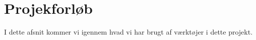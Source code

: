 \section{Projekforløb}
I dette afsnit kommer vi igennem hvad vi har brugt af værktøjer i dette projekt.



